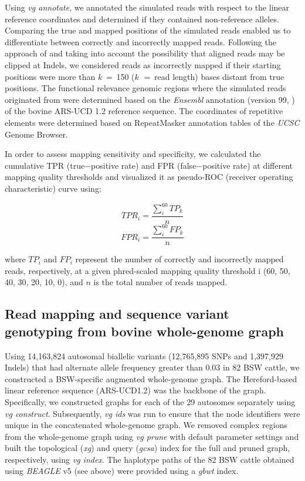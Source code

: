 \documentclass[../main.tex]{subfiles}
\begin{document}
Using \emph{vg annotate}, we annotated the simulated reads with respect to the linear reference coordinates and determined if they contained non-reference alleles. Comparing the true and mapped positions of the simulated reads enabled us to differentiate between correctly and incorrectly mapped reads. Following the approach of \citet{garrison2018variation} and taking into account the possibility that aligned reads may be clipped at Indels, we considered reads as incorrectly mapped if their starting positions were more than $k$ $=$ 150 ($k$ $=$ read length) bases distant from true positions. The functional relevance genomic regions where the simulated reads originated from were determined based on the \emph{Ensembl} annotation (version 99, \citep{yates2020ensembl}) of the bovine ARS-UCD 1.2 reference sequence. The coordinates of repetitive elements were determined based on RepeatMasker \citep{smith2013repeatmasker} annotation tables of the \emph{UCSC} Genome Browser.

In order to assess mapping sensitivity and specificity, we calculated the cumulative TPR (true$-$positive rate) and FPR (false$-$positive rate) at different mapping quality thresholds and visualized it as pseudo-ROC (receiver operating characteristic) curve \citep{garrison2018variation} using:

\[TPR_i=\frac{\sum_{i}^{60}TP_k}{n}\]
\[FPR_i=\frac{\sum_{i}^{60}FP_k}{n}\]

where $TP_i$ and $FP_i$ represent the number of correctly and incorrectly mapped reads, respectively, at a given phred-scaled mapping quality threshold i (60, 50, 40, 30, 20, 10, 0), and $n$ is the total number of reads mapped.

\subsection*{Read mapping and sequence variant genotyping from bovine whole-genome graph}

Using 14,163,824 autosomal biallelic variants (12,765,895 SNPs and 1,397,929 Indels) that had alternate allele frequency greater than 0.03 in 82 BSW cattle, we constructed a BSW-specific augmented whole-genome graph. The Hereford-based linear reference sequence (ARS-UCD1.2) was the backbone of the graph. Specifically, we constructed graphs for each of the 29 autosomes separately using \emph{vg construct}. Subsequently, \emph{vg ids} was run to ensure that the node identifiers were unique in the concatenated whole-genome graph. We removed complex regions from the whole-genome graph using \emph{vg prune} with default parameter settings and built the topological (\emph{xg}) and query (\emph{gcsa}) index for the full and pruned graph, respectively, using \emph{vg index}. The haplotype paths of the 82 BSW cattle obtained using \emph{BEAGLE} v5 (see above) were provided using a \emph{gbwt} index.
\end{document}
